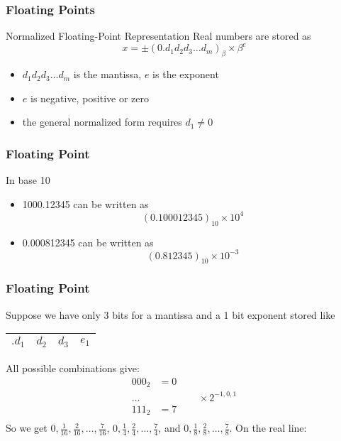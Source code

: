 \documentclass[10pt]{beamer}
\begin{document}
\begin{frame}
\frametitle{Floating Points}
\begin{block}{Normalized Floating-Point Representation}
  Real numbers are stored as
  \begin{equation*}
    x = \pm(0.d_1d_2d_3\dots d_m)_{\beta} \times \beta^{e}
\end{equation*}
\end{block}
\begin{itemize}
  \item $d_1d_2d_3\dots d_m$ is the mantissa, $e$ is the exponent
  \item $e$ is negative, positive or zero
  \item the general normalized form requires $d_1 \ne 0$
\end{itemize}
\end{frame}
\begin{frame}
\frametitle{Floating Point}
\begin{example}
  In base 10
\begin{itemize}
  \item 1000.12345 can be written as
\begin{equation*}
  (0.100012345)_{10} \times 10^4
\end{equation*}
  \item 0.000812345 can be written as
\begin{equation*}
  (0.812345)_{10} \times 10^{-3}
\end{equation*}
\end{itemize}
\end{example}
\end{frame}
\begin{frame}
\frametitle{Floating Point}
  Suppose we have only 3 bits for a mantissa and a 1 bit exponent stored
like

\begin{center}
\begin{tabular}{|c|c|c||c|}\hline
  $.d_1$ & $d_2$ & $d_3$ & $e_1$\\\hline
\end{tabular}
\end{center}

All possible combinations give:
\begin{align*}
000_2 & = 0\\
\dots & \qquad\qquad \times 2^{-1,0,1}\\
111_2 & = 7\\
\end{align*}
So we get $0,\frac{1}{16},\frac{2}{16},\dots,\frac{7}{16}$, 
$0,\frac{1}{4},\frac{2}{4},\dots,\frac{7}{4}$, 
and $0,\frac{1}{8},\frac{2}{8},\dots,\frac{7}{8}$.  On the real line:

\begin{center}
\end{center}

\end{frame}
\end{document}
